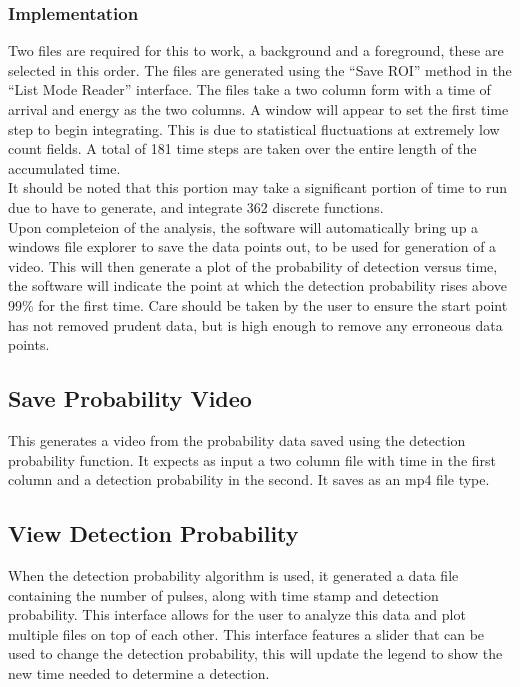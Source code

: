 \subsubsection{Implementation}
	Two files are required for this to work, a background and a foreground, these are selected in this order. The files are generated using the ``Save ROI'' method in the ``List Mode Reader'' interface. The files take a two column form with a time of arrival and energy as the two columns. A window will appear to set the first time step to begin integrating. This is due to statistical fluctuations at extremely low count fields. A total of 181 time steps are taken over the entire length of the accumulated time.\\ 
	
It should be noted that this portion may take a significant portion of time to run due to have to generate, and integrate 362 discrete functions. \\

Upon completeion of the analysis, the software will automatically bring up a windows file explorer to save the data points out, to be used for generation of a video. This will then generate a plot of the probability of detection versus time, the software will indicate the point at which the detection probability rises above 99\% for the first time. Care should be taken by the user to ensure the start point has not removed prudent data, but is high enough to remove any erroneous data points. 

\subsection{Save Probability Video}
	This generates a video from the probability data saved using the detection probability function. It expects as input a two column file with time in the first column and a detection probability in the second. It saves as an mp4 file type.

\subsection{View Detection Probability}
	When the detection probability algorithm is used, it generated a data file containing the number of pulses, along with time stamp and detection probability. This interface allows for the user to analyze this data and plot multiple files on top of each other. This interface features a slider that can be used to change the detection probability, this will update the legend to show the new time needed to determine a detection.


